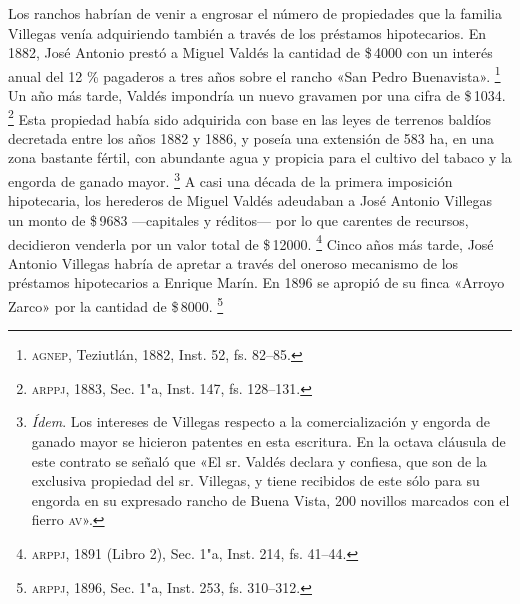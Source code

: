 \documentclass[14pt,twoside,final]{extbook} %
\let\oldfootnote\footnote
\renewcommand\footnote[1]{%
\oldfootnote{\hspace{1mm}#1}}
\begin{document}
Los ranchos habrían de venir a engrosar el número de propiedades que la familia Villegas venía adquiriendo también a través de los préstamos hipotecarios. En 1882, José Antonio prestó a Miguel Valdés la cantidad de \$\,4000 con un interés anual del 12 \% pagaderos a tres años sobre el rancho «San Pedro Buenavista».\footnote{\textsc{agnep}, Teziutlán, 1882, Inst. 52, fs. 82--85.} Un año más tarde, Valdés impondría un nuevo gravamen por una cifra de \$\,1034.\footnote{\textsc{arppj}, 1883, Sec. 1"a, Inst. 147, fs. 128--131.} Esta propiedad había sido adquirida con base en las leyes de terrenos baldíos decretada entre los años 1882 y 1886, y poseía una extensión de 583 ha, en una zona bastante fértil, con abundante agua y propicia para el cultivo del tabaco y la engorda de ganado mayor.\footnote{\emph{Ídem}. Los intereses de Villegas respecto a la comercialización y engorda de ganado mayor se hicieron patentes en esta escritura. En la octava cláusula de este contrato se señaló que «El sr. Valdés declara y confiesa, que son de la exclusiva propiedad del sr. Villegas, y tiene recibidos de este sólo para su engorda en su expresado rancho de Buena Vista, 200 novillos marcados con el fierro \textsc{av}».} A casi una década de la primera imposición hipotecaria, los herederos de Miguel Valdés adeudaban a José Antonio Villegas un monto de \$\,9683 ---capitales y réditos--- por lo que carentes de recursos, decidieron venderla por un valor total de \$\,12000.\footnote{\textsc{arppj}, 1891 (Libro 2), Sec. 1"a, Inst. 214, fs. 41--44.} Cinco años más tarde, José Antonio Villegas habría de apretar a través del oneroso mecanismo de los préstamos hipotecarios a Enrique Marín. En 1896 se apropió de su finca «Arroyo Zarco» por la cantidad de \$\,8000.\footnote{\textsc{arppj}, 1896, Sec. 1"a, Inst. 253, fs. 310--312.}
\end{document}
